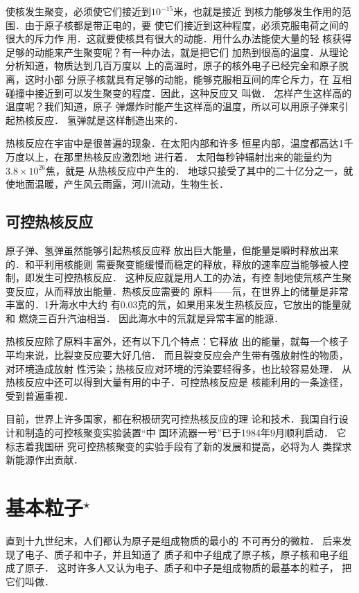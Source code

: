 使核发生聚变，必须使它们接近到$10^{-15}$米，也就是接近
到核力能够发生作用的范围．由于原子核都是带正电的，要
使它们接近到这种程度，必须克服电荷之间的很大的斥力作
用．这就要使核具有很大的动能．用什么办法能使大量的轻
核获得足够的动能来产生聚变呢？有一种办法，就是把它们
加热到很高的温度．从理论分析知道，物质达到几百万度以
上的高温时，原子的核外电子已经完全和原子脱离，这时小部
分原子核就具有足够的动能，能够克服相互间的库仑斥力，在
互相碰撞中接近到可以发生聚变的程度．因此，这种反应又
叫做．
怎样产生这样高的温度呢？我们知道，原子
弹爆炸时能产生这样高的温度，所以可以用原子弹来引起热核反应．
氢弹就是这样制造出来的．

热核反应在宇宙中是很普遍的现象．在太阳内部和许多
恒星内部，温度都高达1千万度以上，在那里热核反应激烈地
进行着．
太阳每秒钟辐射出来的能量约为$3.8\times10^{26}$焦，就是
从热核反应中产生的．
地球只接受了其中的二十亿分之一，就
使地面温暖，产生风云雨露，河川流动，生物生长．

\subsection{可控热核反应}

原子弹、氢弹虽然能够引起热核反应释
放出巨大能量，但能量是瞬时释放出来的．和平利用核能则
需要聚变能缓慢而稳定的释放，释放的速率应当能够被人控
制，即发生可控热核反应．
这种反应就是用人工的办法，有控
制地使氘核产生聚变反应，从而释放出能量．热核反应需要的
原料——氘，在世界上的储量是非常丰富的．1升海水中大约
有0.03克的氘，如果用来发生热核反应，它放出的能量就和
燃烧三百升汽油相当．
因此海水中的氘就是异常丰富的能源．

热核反应除了原料丰富外，还有以下几个特点：它释放
出的能量，就每一个核子平均来说，比裂变反应要大好几倍．
而且裂变反应会产生带有强放射性的物质，对环境造成放射
性污染；热核反应对环境的污染要轻得多，也比较容易处理．
从热核反应中还可以得到大量有用的中子．可控热核反应是
核能利用的一条途径，受到普遍重视．

目前，世界上许多国家，都在积极研究可控热核反应的理
论和技术．我国自行设计和制造的可控核聚变实验装置“中
国环流器一号”已于1984年9月顺利启动．
它标志着我国研
究可控热核聚变的实验手段有了新的发展和提高，必将为人
类探求新能源作出贡献．

\section{基本粒子$^\star$}\label{sec_C_9-8}

直到十九世纪末，人们都认为原子是组成物质的最小的
不可再分的微粒．
后来发现了电子、质子和中子，并且知道了
质子和中子组成了原子核，原子核和电子组成了原子．
这时许多人又认为电子、质子和中子是组成物质的最基本的粒子，
把它们叫做．

